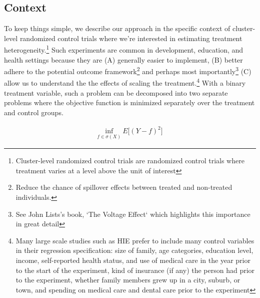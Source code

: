 \documentclass[a4paper,12pt]{article}
\begin{document}
\subsection{Context}
To keep things simple, we describe our approach in the specific context of cluster-level randomized control trials where we're interested in estimating treatment heterogeneity.\footnote{ Cluster-level randomized control trials are randomized control trials where treatment varies at a level above the unit of interest} Such experiments are common in development, education, and health settings because they are (A) generally easier to implement, (B) better adhere to the potential outcome framework\footnote{Reduce the chance of spillover effects between treated and non-treated individuals.} and perhaps most importantly\footnote{See John Lists's book, `The Voltage Effect` which highlights this importance in great detail} (C) allow us to understand the the effects of scaling the treatment.\footnote{Many large scale studies such as HIE prefer to include many control variables in their regression specification: size of family, age categories, education level, income, self-reported health status, and use of medical care in the year prior to the start of the experiment, kind of insurance (if any) the person had prior to the experiment, whether family members grew up in a city, suburb, or town, and spending on medical care and dental care prior to the experiment} With a binary treatment variable, such a problem can be decomposed into two separate problems where the objective function is minimized separately over the treatment and control groups.

\begin{align*}
    \underset{f \in \sigma(X)}{\text{inf}} \ E\big[(Y - f)^2\big]
\end{align*}
 
\end{document}
